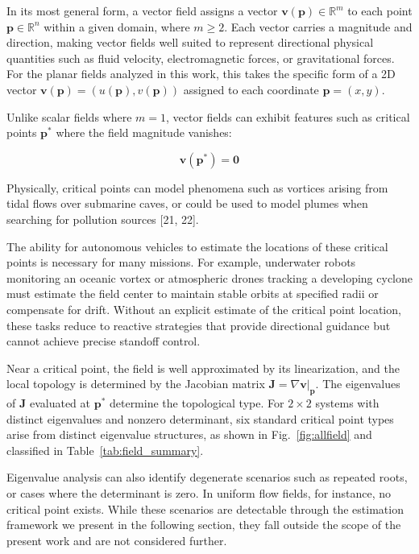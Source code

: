 \documentclass[lettersize,journal]{IEEEtran}
\begin{document}
In its most general form, a vector field assigns a vector $\mathbf{v}(\mathbf{p}) \in \mathbb{R}^m$ to each point $\mathbf{p} \in \mathbb{R}^n$ within a given domain, where $m \geq 2$. Each vector carries a magnitude and direction, making vector fields well suited to represent directional physical quantities such as fluid velocity, electromagnetic forces, or gravitational forces. For the planar fields analyzed in this work, this takes the specific form of a 2D vector $\mathbf{v}(\mathbf{p}) = (u(\mathbf{p}), v(\mathbf{p}))$ assigned to each coordinate $\mathbf{p} = (x, y)$.

Unlike scalar fields where $m=1$, vector fields can exhibit features such as critical points $\mathbf{p}^*$ where the field magnitude vanishes:

\begin{equation}
\mathbf{v}(\mathbf{p}^*) = \mathbf{0}
\end{equation}

Physically, critical points can model phenomena such as vortices arising from tidal flows over submarine caves, or could be used to model plumes when searching for pollution sources [21, 22].

The ability for autonomous vehicles to estimate the locations of these critical points is necessary for many missions. For example, underwater robots monitoring an oceanic vortex or atmospheric drones tracking a developing cyclone must estimate the field center to maintain stable orbits at specified radii or compensate for drift. Without an explicit estimate of the critical point location, these tasks reduce to reactive strategies that provide directional guidance but cannot achieve precise standoff control.

Near a critical point, the field is well approximated by its linearization, and the local topology is determined by the Jacobian matrix $\mathbf{J} = \nabla\mathbf{v}|_{\mathbf{p}}$. The eigenvalues of $\mathbf{J}$ evaluated at $\mathbf{p}^*$ determine the topological type. For $2 \times 2$ systems with distinct eigenvalues and nonzero determinant, six standard critical point types arise from distinct eigenvalue structures, as shown in Fig.~\ref{fig:allfield} and classified in Table~\ref{tab:field_summary}.

Eigenvalue analysis can also identify degenerate scenarios such as repeated roots, or cases where the determinant is zero. In uniform flow fields, for instance, no critical point exists. While these scenarios are detectable through the estimation framework we present in the following section, they fall outside the scope of the present work and are not considered further.
\end{document}

